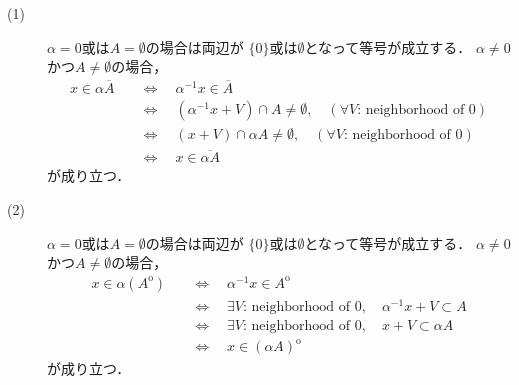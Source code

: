 	\begin{prf}\mbox{}
		\begin{description}
			\item[(1)] $\alpha = 0$或は$A = \emptyset$の場合は両辺が
				$\{0\}$或は$\emptyset$となって等号が成立する．
				$\alpha \neq 0$かつ$A \neq \emptyset$の場合，
				\begin{align}
					x \in \alpha \overline{A}
					\quad &\Longleftrightarrow \quad
					\alpha^{-1}x \in \overline{A} \\
					\quad &\Longleftrightarrow \quad
					\left(\alpha^{-1}x + V\right) \cap A \neq \emptyset, \quad 
						(\mbox{$\forall V$: neighborhood of 0}) \\
					\quad &\Longleftrightarrow \quad
					\left(x + V\right) \cap \alpha A \neq \emptyset, \quad 
						(\mbox{$\forall V$: neighborhood of 0}) \\
					\quad &\Longleftrightarrow \quad
					x \in \overline{\alpha A}
				\end{align}
				が成り立つ．
				
			\item[(2)] $\alpha = 0$或は$A = \emptyset$の場合は両辺が
				$\{0\}$或は$\emptyset$となって等号が成立する．
				$\alpha \neq 0$かつ$A \neq \emptyset$の場合，
				\begin{align}
					x \in \alpha (A^{\mathrm{o}})
					\quad &\Longleftrightarrow \quad
					\alpha^{-1}x \in A^{\mathrm{o}} \\
					\quad &\Longleftrightarrow \quad
					\mbox{$\exists V$: neighborhood of 0},\quad \alpha^{-1}x + V \subset A \\
					\quad &\Longleftrightarrow \quad
					\mbox{$\exists V$: neighborhood of 0},\quad x + V \subset \alpha A \\
					\quad &\Longleftrightarrow \quad
					x \in (\alpha A)^{\mathrm{o}}
				\end{align}
				が成り立つ．
				
		\end{description}
	\end{prf}
	
